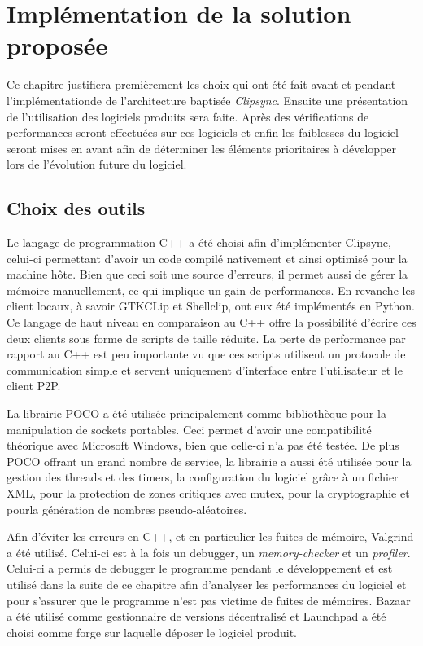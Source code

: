 \chapter{Implémentation de la solution proposée}
\renewcommand{\leftmark}{\thechapter.~~Implémentation de la solution proposée}
Ce chapitre justifiera premièrement les choix qui ont été fait avant et
pendant l'implémentationde de l'architecture baptisée \emph{Clipsync}.
Ensuite une présentation de l'utilisation des
logiciels produits sera faite. Après des vérifications de performances seront
effectuées sur ces logiciels et enfin les faiblesses du logiciel seront mises
en avant afin de déterminer les éléments prioritaires à développer lors de
l'évolution future du logiciel.

\section{Choix des outils}
Le langage de programmation C++ a été choisi afin d'implémenter Clipsync,
celui-ci permettant d'avoir un code compilé nativement et ainsi optimisé
pour la machine hôte. Bien que ceci soit une source d'erreurs, il permet
aussi de gérer la mémoire manuellement, ce qui implique un gain de
performances. En revanche les client locaux, à savoir GTKCLip et Shellclip,
ont eux été implémentés en Python. Ce langage de haut niveau en comparaison
au C++ offre la possibilité d'écrire ces deux clients sous forme de scripts
de taille réduite. La perte de performance par rapport au C++ est peu
importante vu que ces scripts utilisent un protocole de communication simple
et servent uniquement d'interface entre l'utilisateur et le client P2P.

La librairie POCO\cite{poco} a été utilisée principalement comme bibliothèque
pour la manipulation de sockets portables. Ceci permet d'avoir une
compatibilité théorique avec Microsoft Windows, bien que celle-ci n'a pas
été testée. De plus POCO offrant un grand nombre de service, la librairie
a aussi été utilisée pour la gestion des threads et des timers, la
configuration du logiciel grâce à un fichier XML, pour la protection de
zones critiques avec mutex, pour la cryptographie et pourla génération de
nombres pseudo-aléatoires.

Afin d'éviter les erreurs en C++, et en particulier les fuites de mémoire,
Valgrind\cite{valgrind} a été utilisé. Celui-ci est à la fois un debugger,
un \emph{memory-checker} et un \emph{profiler}. Celui-ci a permis de debugger
le programme pendant le développement et est utilisé dans la suite de ce
chapitre afin d'analyser les performances du logiciel et pour s'assurer que
le programme n'est pas victime de fuites de mémoires.
Bazaar\cite{bzr} a été utilisé comme gestionnaire de versions décentralisé et
Launchpad\cite{launchpad} a été choisi comme forge sur laquelle déposer le
logiciel produit.


